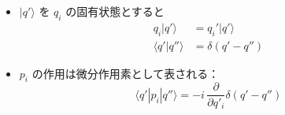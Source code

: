 \documentclass[a4paper,12pt]{article}
\begin{document}
\begin{itemize}
\begin{proof}
    このとき, $[q_i, F(p)]$ を計算する:
    \begin{align*}
        [q_i, F(p)] 
        &= \left[ q_i, \sum_{\bm{\alpha}} c_{\bm{\alpha}}\, p_1^{\alpha_1} \cdots p_n^{\alpha_n} \right] \tag{1-1.a2} \\
        &= \sum_{\bm{\alpha}} c_{\bm{\alpha}}\, [q_i, p_1^{\alpha_1} \cdots p_n^{\alpha_n}] \tag{1-1.a3}
    \end{align*}

    各項の交換子は, Leibniz の法則と $[q_i, p_j] = i \delta_{ij}$ を用いて, 以下のように計算される:

    \begin{equation*}
    [q_i, p_1^{\alpha_1} \cdots p_n^{\alpha_n}] = i\, \frac{\partial}{\partial p_i} \left( p_1^{\alpha_1} \cdots p_n^{\alpha_n} \right) \tag{1-1.a4}
    \end{equation*}

    これらの結果から, 結局

    \begin{align*}
    [q_i, F(p)] 
    &= i\, \sum_{\bm{\alpha}} c_{\bm{\alpha}}\, \frac{\partial}{\partial p_i} \left( p_1^{\alpha_1} \cdots p_n^{\alpha_n} \right) \tag{1-1.a5} \\
    &= i\, \frac{\partial F}{\partial p_i}. \tag{1-1.a6}
    \end{align*}
    よって, $F(q, p)$ が $p$ に関してテイラー展開可能であり, $q$ との順序に注意して演算子積が定義されているとき, 次の関係が成り立つ:

    \begin{equation*}
    [q_i, F(q, p)] = i\frac{\partial F}{\partial p_i} \tag{1-1.a7}
    \end{equation*}
    \end{proof}
    \color{black}
    同様に, $q_i$ についても同様な関係が成り立つ:
    
    \item $|q'\rangle$ を $q_i$ の固有状態とすると
      \begin{align*}
      q_i |q'\rangle &= q_i' |q'\rangle \\
      \langle q'|q''\rangle &= \delta(q' - q'')
      \end{align*}
    
    \item $p_i$ の作用は微分作用素として表される：
      \begin{equation*}
      \langle q'|p_i|q''\rangle = -i\, \frac{\partial}{\partial q'_i} \delta(q' - q'')
      \end{equation*}
    

\end{itemize}
\end{document}
